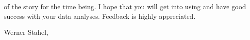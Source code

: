 \documentclass[11pt]{article}\usepackage[]{graphicx}\usepackage[]{color}
\begin{document}


\vspace{10mm}\noindent
{\small
{} of the story for the time being. I hope that you will
get into using  and have good success with your data analyses.
Feedback is highly appreciated.


Werner Stahel, 
}
\end{document}

